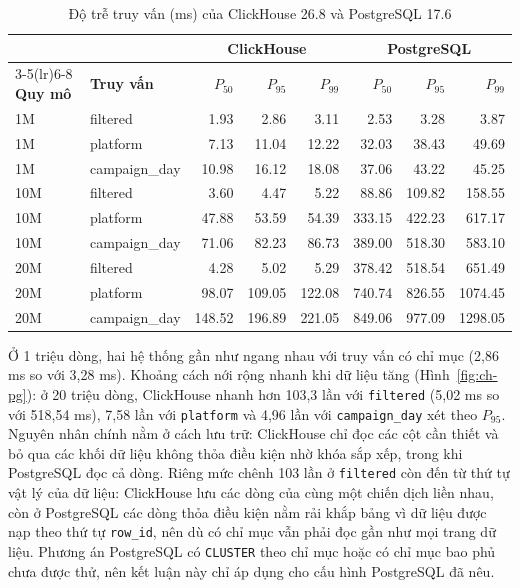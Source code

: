 \begin{table}[H]
\centering
\caption{Độ trễ truy vấn (ms) của ClickHouse 26.8 và PostgreSQL 17.6}
\label{tab:ch-pg}
\small
\renewcommand{\arraystretch}{1.15}
\begin{tabular}{llrrrrrr}
\toprule
 & & \multicolumn{3}{c}{\textbf{ClickHouse}} & \multicolumn{3}{c}{\textbf{PostgreSQL}} \\
\cmidrule(lr){3-5}\cmidrule(lr){6-8}
\textbf{Quy mô} & \textbf{Truy vấn} & $P_{50}$ & $P_{95}$ & $P_{99}$ & $P_{50}$ & $P_{95}$ & $P_{99}$ \\
\midrule
1M & filtered & \num{1.93} & \num{2.86} & \num{3.11} & \num{2.53} & \num{3.28} & \num{3.87} \\
1M & platform & \num{7.13} & \num{11.04} & \num{12.22} & \num{32.03} & \num{38.43} & \num{49.69} \\
1M & campaign\_day & \num{10.98} & \num{16.12} & \num{18.08} & \num{37.06} & \num{43.22} & \num{45.25} \\
\midrule
10M & filtered & \num{3.60} & \num{4.47} & \num{5.22} & \num{88.86} & \num{109.82} & \num{158.55} \\
10M & platform & \num{47.88} & \num{53.59} & \num{54.39} & \num{333.15} & \num{422.23} & \num{617.17} \\
10M & campaign\_day & \num{71.06} & \num{82.23} & \num{86.73} & \num{389.00} & \num{518.30} & \num{583.10} \\
\midrule
20M & filtered & \num{4.28} & \num{5.02} & \num{5.29} & \num{378.42} & \num{518.54} & \num{651.49} \\
20M & platform & \num{98.07} & \num{109.05} & \num{122.08} & \num{740.74} & \num{826.55} & \num{1074.45} \\
20M & campaign\_day & \num{148.52} & \num{196.89} & \num{221.05} & \num{849.06} & \num{977.09} & \num{1298.05} \\
\bottomrule
\end{tabular}
\end{table}

Ở 1 triệu dòng, hai hệ thống gần như ngang nhau với truy vấn có chỉ mục (2,86 ms so với 3,28 ms). Khoảng cách nới rộng nhanh khi dữ liệu tăng (Hình~\ref{fig:ch-pg}): ở 20 triệu dòng, ClickHouse nhanh hơn 103,3 lần với \texttt{filtered} (5,02 ms so với 518,54 ms), 7,58 lần với \texttt{platform} và 4,96 lần với \texttt{campaign\_day} xét theo $P_{95}$. Nguyên nhân chính nằm ở cách lưu trữ: ClickHouse chỉ đọc các cột cần thiết và bỏ qua các khối dữ liệu không thỏa điều kiện nhờ khóa sắp xếp, trong khi PostgreSQL đọc cả dòng. Riêng mức chênh 103 lần ở \texttt{filtered} còn đến từ thứ tự vật lý của dữ liệu: ClickHouse lưu các dòng của cùng một chiến dịch liền nhau, còn ở PostgreSQL các dòng thỏa điều kiện nằm rải khắp bảng vì dữ liệu được nạp theo thứ tự \texttt{row\_id}, nên dù có chỉ mục vẫn phải đọc gần như mọi trang dữ liệu. Phương án PostgreSQL có \texttt{CLUSTER} theo chỉ mục hoặc có chỉ mục bao phủ chưa được thử, nên kết luận này chỉ áp dụng cho cấu hình PostgreSQL đã nêu.

